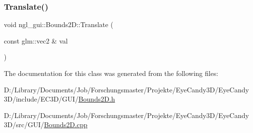 \mbox{\label{classngl__gui_1_1_bounds2_d_ae194f1a4c97b962c45354af32b54e439}} 
\subsubsection{\texorpdfstring{Translate()}{Translate()}}
{\footnotesize\ttfamily void ngl\+\_\+gui\+::\+Bounds2\+D\+::\+Translate (\begin{DoxyParamCaption}\item[{const glm\+::vec2 \&}]{val }\end{DoxyParamCaption})}



The documentation for this class was generated from the following files\+:\begin{DoxyCompactItemize}
\item 
D\+:/\+Library/\+Documents/\+Job/\+Forschungsmaster/\+Projekte/\+Eye\+Candy3\+D/\+Eye\+Candy3\+D/include/\+E\+C3\+D/\+G\+U\+I/\mbox{\hyperlink{_bounds2_d_8h}{Bounds2\+D.\+h}}\item 
D\+:/\+Library/\+Documents/\+Job/\+Forschungsmaster/\+Projekte/\+Eye\+Candy3\+D/\+Eye\+Candy3\+D/src/\+G\+U\+I/\mbox{\hyperlink{_bounds2_d_8cpp}{Bounds2\+D.\+cpp}}\end{DoxyCompactItemize}
